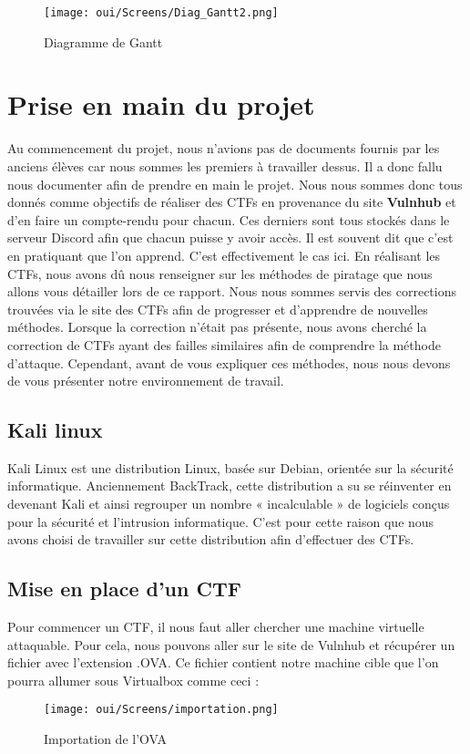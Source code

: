 \begin{landscape}
\begin{figure}[htp!]
\centering
  \setlength\figureheight{7cm}
  \setlength\figurewidth{9cm}
\texttt{[image: oui/Screens/Diag\_Gantt2.png]}
  \caption{Diagramme de Gantt}
  \label{fig:courbe-tikz}
\end{figure}
\end{landscape}

\section{Prise en main du projet}
Au commencement du projet, nous n’avions pas de documents fournis par les anciens élèves car nous sommes les premiers à travailler dessus. Il a donc fallu nous documenter afin de prendre en main le projet. Nous nous sommes donc tous donnés comme objectifs de réaliser des CTFs en provenance du site \textbf{Vulnhub} et d’en faire un compte-rendu pour chacun. Ces derniers sont tous stockés dans le serveur Discord afin que chacun puisse y avoir accès. Il est souvent dit que c’est en pratiquant que l’on apprend. C’est effectivement le cas ici. En réalisant les CTFs, nous avons dû nous renseigner sur les méthodes de piratage que nous allons vous détailler lors de ce rapport. Nous nous sommes servis des corrections trouvées via le site des CTFs afin de progresser et d’apprendre de nouvelles méthodes. Lorsque la correction n’était pas présente, nous avons cherché la correction de CTFs ayant des failles similaires afin de comprendre la méthode d’attaque.
Cependant, avant de vous expliquer ces méthodes, nous nous devons de vous présenter notre environnement de travail.

\subsection{Kali linux}
Kali Linux est une distribution Linux, basée sur Debian, orientée sur la sécurité informatique. Anciennement BackTrack, cette distribution a su se réinventer en devenant Kali et ainsi regrouper un nombre « incalculable » de logiciels conçus pour la sécurité et l’intrusion informatique. C’est pour cette raison que nous avons choisi de travailler sur cette distribution afin d'effectuer des CTFs.

\subsection{Mise en place d'un CTF}
Pour commencer un CTF, il nous faut aller chercher une machine virtuelle attaquable. Pour cela, nous pouvons aller sur le site de Vulnhub et récupérer un fichier avec l’extension .OVA. Ce fichier contient notre machine cible que l’on pourra allumer sous Virtualbox comme ceci :
\begin{figure}[htp!]
  \centering
  \setlength\figureheight{7cm}
  \setlength\figurewidth{9cm}
  \texttt{[image: oui/Screens/importation.png]}
  \caption{Importation de l'OVA}
  \label{fig:courbe-tikz}
\end{figure}

